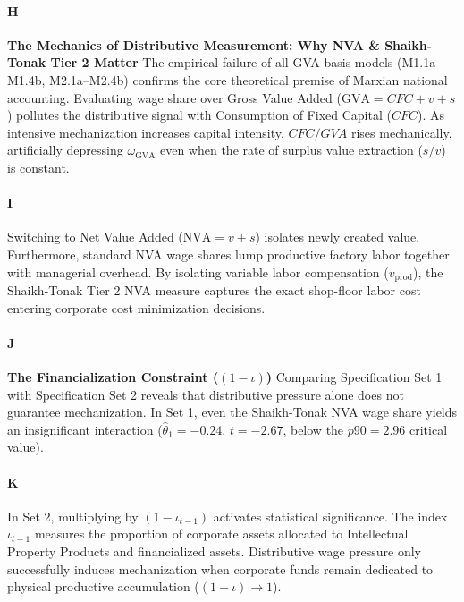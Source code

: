\paragraph{H}
\textbf{The Mechanics of Distributive Measurement: Why NVA \& Shaikh-Tonak Tier 2 Matter}
The empirical failure of all GVA-basis models (M1.1a–M1.4b, M2.1a–M2.4b) confirms the core theoretical premise of Marxian national accounting. Evaluating wage share over Gross Value Added ($\text{GVA} = CFC + v + s$) pollutes the distributive signal with Consumption of Fixed Capital ($CFC$). As intensive mechanization increases capital intensity, $CFC/GVA$ rises mechanically, artificially depressing $\omega_{\text{GVA}}$ even when the rate of surplus value extraction ($s/v$) is constant.

\paragraph{I}
Switching to Net Value Added ($\text{NVA} = v + s$) isolates newly created value. Furthermore, standard NVA wage shares lump productive factory labor together with managerial overhead. By isolating variable labor compensation ($v_{\text{prod}}$), the Shaikh-Tonak Tier 2 NVA measure captures the exact shop-floor labor cost entering corporate cost minimization decisions.

\paragraph{J}
\textbf{The Financialization Constraint ($(1 - \iota)$)}
Comparing Specification Set 1 with Specification Set 2 reveals that distributive pressure alone does not guarantee mechanization. In Set 1, even the Shaikh-Tonak NVA wage share yields an insignificant interaction ($\hat{\theta}_1 = -0.24$, $t = -2.67$, below the $p90 = 2.96$ critical value).

\paragraph{K}
In Set 2, multiplying by $(1 - \iota_{t-1})$ activates statistical significance. The index $\iota_{t-1}$ measures the proportion of corporate assets allocated to Intellectual Property Products and financialized assets. Distributive wage pressure only successfully induces mechanization when corporate funds remain dedicated to physical productive accumulation ($(1 - \iota) \to 1$).

